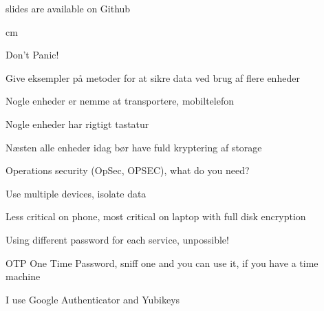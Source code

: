 \documentclass[18pt,landscape,a4paper,footrule]{foils}
\begin{document}


\vskip 1cm
\centerline{\footnotesize slides are available on Github}


 cm


\centerline{\color{titlecolor}\LARGE Don't Panic!}

\begin{list1}
\item Give eksempler på metoder for at sikre data ved brug af flere enheder
\end{list1}





\begin{list2}
\item Nogle enheder er nemme at transportere, mobiltelefon
\item Nogle enheder har rigtigt tastatur
\end{list2}

\centerline{Næsten alle enheder idag bør have fuld kryptering af storage}


\begin{list1}
\item Operations security (OpSec, OPSEC), what do you need?\\
\item Use multiple devices, isolate data
\item Less critical on phone, most critical on laptop with full disk encryption
\item Using different password for each service, unpossible!
\end{list1}



\begin{list1}
\item OTP One Time Password, sniff one and you can use it, if you have a time machine \smiley
\item I use Google Authenticator and Yubikeys
\item {}
\item {}
\end{list1}
\end{document}
